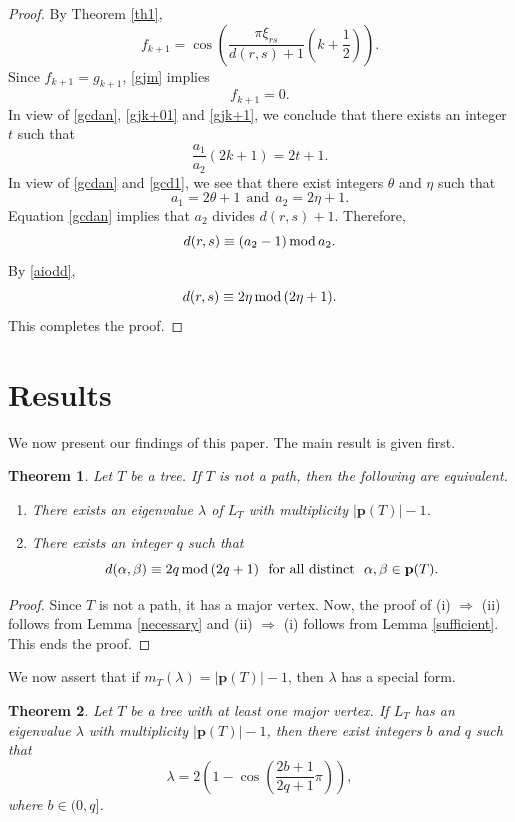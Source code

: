 \documentclass[preprint,12pt]{elsarticle}
\newcommand{\1}{\mathbf{1}}
\newcommand{\0}{\mathbf{0}}
\def\pt{\mathbf{p}}
\newtheorem{theorem}{Theorem}
\begin{document}
\begin{proof}
By Theorem \ref{th1},
\begin{equation}\label{gjk+01}
f_{k+1}=\cos \left(\frac{\pi \xi_{rs}}{d(r,s)+1}\left(k+\frac{1}{2}\right)\right).    
\end{equation} 
Since $f_{k+1}=g_{k+1}$, \eqref{gjm} implies
\begin{equation} \label{gjk+1}
 f_{k+1}=0.
\end{equation}
In view of \eqref{gcdan}, \eqref{gjk+01} and \eqref{gjk+1}, we conclude that there exists an integer $t$ such that 
\begin{equation}\label{gcd1}
 \frac{a_1}{a_2}(2k+1)=2t+1. 
\end{equation}
In view of \eqref{gcdan} and \eqref{gcd1}, we see that 
there exist integers $\theta$ and $\eta$ such that
\begin{equation} \label{aiodd}
a_1=2\theta+1~~\mbox{and}~~a_2=2 \eta+1.
\end{equation}
Equation \eqref{gcdan} implies that
$a_2$ divides $d(r,s)+1$. Therefore, 
\[d(r,s)\equiv (a_2-1)\,{\rm{mod}}\,a_2.\]
By \eqref{aiodd},
\begin{equation*}\label{finaleq}
  d(r,s) \equiv 2\eta\,{\rm{mod}}\,(2\eta+1).  
\end{equation*}
This completes the proof.
\end{proof}


\section{Results}
We now present our findings of this paper. The main result is given first. 

\begin{theorem}\label{main}
 Let $T$ be a tree. If $T$ is not a path, then the following are equivalent.
 \begin{enumerate}
     \item[\rm{(i)}]  There exists an eigenvalue $\lambda$ of $L_T$ with multiplicity $|\pt(T)|-1$.
     \item[\rm{(ii)}]There exists an integer $q$ such that $$d(\alpha,\beta)\equiv 2q\,{\rm{mod}}\,(2q+1)~~\text{for all distinct}~~\alpha,\beta\in \pt(T).$$
 \end{enumerate}
 \end{theorem}

\begin{proof}
Since $T$ is not a path, it has a major vertex. Now, the proof of (i) $\Rightarrow$ (ii) follows from Lemma \ref{necessary} and (ii) $\Rightarrow$ (i) follows from Lemma \ref{sufficient}. This ends the proof.
\end{proof}
We now assert that if $m_{T}(\lambda)=|\pt(T)|-1$, then $\lambda$ has
a special form.
\begin{theorem}\label{th1m}
Let $T$ be a tree with at least one major vertex. If $L_T$ has an eigenvalue $\lambda$ with multiplicity $|\pt(T)|-1$, then there exist integers $b$ and $q$ such that \[\lambda=2\left(1-\cos\left(\frac{2b+1}{2q+1}\pi\right)\right),\] where $b\in (0,q]$.
\end{theorem}
\end{document}
